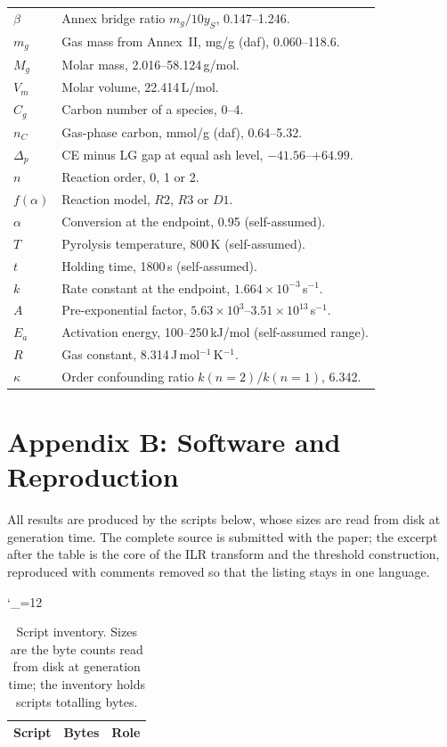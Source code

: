 \documentclass[withoutpreface,bwprint]{apmcmthesis}
\begin{document}
\begin{longtable}{@{}p{}p{}@{}}
$\beta$ & Annex bridge ratio $m_g/10y_{S}$, 0.147--1.246.\\
$m_g$ & Gas mass from Annex~II, mg/g (daf), 0.060--118.6.\\
$M_g$ & Molar mass, 2.016--58.124\,g/mol.\\
$V_m$ & Molar volume, 22.414\,L/mol.\\
$C_g$ & Carbon number of a species, 0--4.\\
$n_C$ & Gas-phase carbon, mmol/g (daf), 0.64--5.32.\\
$\Delta_p$ & CE minus LG gap at equal ash level, $-41.56$--$+64.99$.\\
$n$ & Reaction order, 0, 1 or 2.\\
$f(\alpha)$ & Reaction model, $R2$, $R3$ or $D1$.\\
$\alpha$ & Conversion at the endpoint, 0.95 (self-assumed).\\
$T$ & Pyrolysis temperature, 800\,K (self-assumed).\\
$t$ & Holding time, 1800\,s (self-assumed).\\
$k$ & Rate constant at the endpoint, $1.664\times10^{-3}$\,s$^{-1}$.\\
$A$ & Pre-exponential factor, $5.63\times10^{3}$--$3.51\times10^{13}$\,s$^{-1}$.\\
$E_a$ & Activation energy, 100--250\,kJ/mol (self-assumed range).\\
$R$ & Gas constant, 8.314\,J\,mol$^{-1}$\,K$^{-1}$.\\
$\kappa$ & Order confounding ratio $k(n{=}2)/k(n{=}1)$, 6.342.\\
\bottomrule
\end{longtable}
\endgroup

\section{Appendix B: Software and Reproduction}
All results are produced by the scripts below, whose sizes are read from disk at generation time. The complete source is submitted with the paper; the excerpt after the table is the core of the ILR transform and the threshold construction, reproduced with comments removed so that the listing stays in one language.


\begingroup
\catcode`\_=12
\begin{table}[htbp]\centering
\caption{Script inventory. Sizes are the byte counts read from disk at generation time; the inventory holds \CodeIndexCount{} scripts totalling \CodeIndexBytes{} bytes.}
\label{tab:code}
{\small\setlength{\tabcolsep}{2.2pt}
\begin{tabular}{@{}lll@{}}
\toprule
Script & Bytes & Role\\
\midrule

\end{tabular}}
\end{table}
\endgroup
\end{document}
